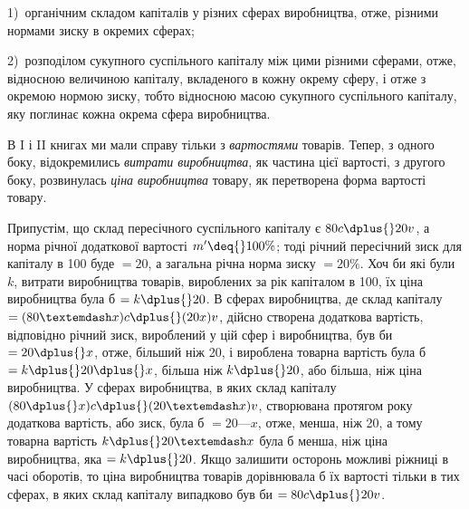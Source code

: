 1)~органічним складом капіталів у різних сферах виробництва,
отже, різними нормами зиску в окремих сферах;

2)~розподілом сукупного суспільного капіталу між цими різними сферами, отже, відносною величиною
капіталу, вкладеного
в кожну окрему сферу, і отже з окремою нормою зиску, тобто
відносною масою сукупного суспільного капіталу, яку поглинає
кожна окрема сфера виробництва.

В I і II книгах ми мали справу тільки з \emph{вартостями} товарів.
Тепер, з одного боку, відокремились \emph{витрати виробництва}, як
частина цієї вартості, з другого боку, розвинулась \emph{ціна виробництва} товару, як перетворена форма
вартості товару.

Припустім, що склад пересічного суспільного капіталу є
$80 c \dplus{} 20 v$, а норма річної додаткової вартості $m' \deq{} 100\%$; тоді
річний пересічний зиск для капіталу в 100 буде $= 20$, а загальна
річна норма зиску $= 20\%$. Хоч би які були $k$, витрати виробництва
товарів, вироблених за рік капіталом в 100, їх ціна виробництва була б $= k \dplus{} 20$. В сферах
виробництва, де склад капіталу $= (80 — x) c \dplus{} (20 x) v$, дійсно створена додаткова вартість,
відповідно річний зиск, вироблений у цій сфер і виробництва,
був би $= 20 \dplus{} x$, отже, більший ніж 20, і вироблена
товарна вартість була б $= k \dplus{} 20 \dplus{} x$, більша ніж $k \dplus{} 20$, або
більша, ніж ціна виробництва. У сферах виробництва, в яких
склад капіталу $(80 \dplus{} x) c \dplus{} (20 — x) v$, створювана протягом року
додаткова вартість, або зиск, була б $= 20 — x$, отже, менша, ніж 20,
а тому товарна вартість $k \dplus{} 20 — x$ була б менша, ніж ціна виробництва, яка $= k \dplus{} 20$. Якщо залишити
осторонь можливі ріжниці в часі оборотів, то ціна виробництва товарів дорівнювала б їх вартості
тільки в тих сферах, в яких склад капіталу випадково був би $= 80 c \dplus{} 20 v$.

